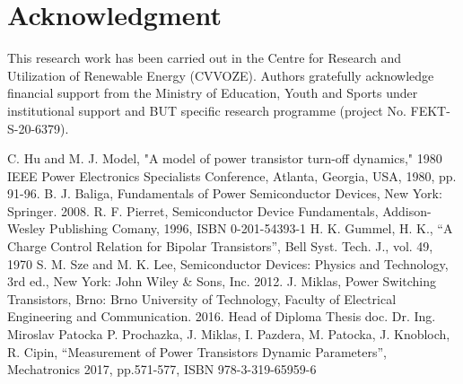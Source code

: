 \documentclass[conference]{IEEEtran}
\begin{document}
\section*{Acknowledgment}
This research work has been carried out in the Centre for Research and
Utilization of Renewable Energy (CVVOZE).  Authors gratefully acknowledge
financial support from the Ministry of Education, Youth and Sports under
institutional support and BUT specific research programme (project No.
FEKT-S-20-6379).


\begin{thebibliography}{00}
	 C. Hu and M. J. Model, "A model of power transistor turn-off dynamics," 1980 IEEE Power Electronics Specialists Conference, Atlanta, Georgia, USA, 1980, pp. 91-96.
	 B. J. Baliga, Fundamentals of Power Semiconductor Devices, New York: Springer. 2008.
	 R. F. Pierret, {Semiconductor Device Fundamentals}, Addison-Wesley Publishing Comany, 1996, ISBN 0-201-54393-1
	 H. K. Gummel, H. K., ``A Charge Control Relation for Bipolar Transistors'', Bell Syst. Tech. J., vol. 49, 1970
	 S. M. Sze and M. K. Lee, Semiconductor Devices: Physics and Technology, 3rd ed., New York: John Wiley \& Sons, Inc. 2012.
	 J. Miklas, {Power Switching Transistors}, Brno: Brno University of Technology, Faculty of Electrical Engineering and Communication. 2016. Head of Diploma Thesis doc. Dr. Ing. Miroslav Patocka
	 P. Prochazka, J. Miklas, I. Pazdera, M. Patocka, J. Knobloch, R. Cipin, ``Measurement of Power Transistors Dynamic Parameters'', Mechatronics 2017, pp.571-577, ISBN 978-3-319-65959-6


\end{thebibliography}
\end{document}
